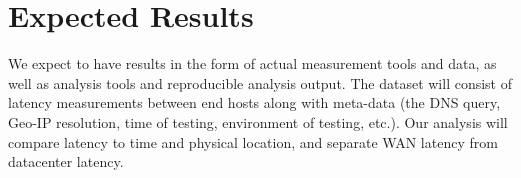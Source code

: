 
\section{Expected Results}
\label{sec:results}

We expect to have results in the form of actual measurement tools and data, as well as analysis tools and reproducible analysis output. The dataset will consist of latency measurements between end hosts along with meta-data (the DNS query, Geo-IP resolution, time of testing, environment of testing, etc.). Our analysis will compare latency to time and physical location, and separate WAN latency from datacenter latency.

